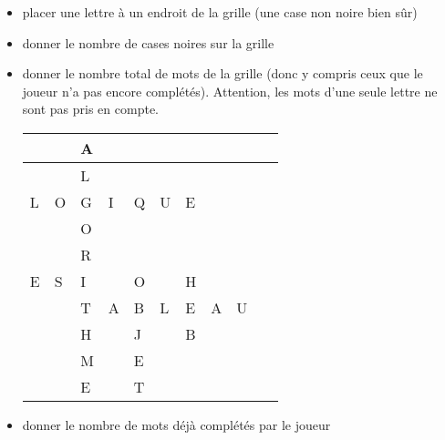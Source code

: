 \liststyleListi
\begin{itemize}
\item {
placer une lettre à un endroit de la grille (une case non noire bien
sûr)}
\item {
donner le nombre de cases noires sur la grille}
\item {
donner le nombre total de mots de la grille (donc y compris ceux que le
joueur n’a pas encore complétés). Attention, les mots
d'une seule lettre ne sont pas pris en compte.}
\begin{center}
\begin{minipage}{5.749cm}
\begin{center}
\tablehead{}
\begin{supertabular}{|m{0.37cm}|m{0.37cm}|m{0.37cm}|m{0.37cm}|m{0.37cm}|m{0.37cm}|m{0.37cm}|m{0.37cm}|m{0.37cm}|m{0.41900003cm}|}
\hline
~
 &
~
 &
\centering  A &
~
 &
~
 &
~
 &
~
 &
~
 &
~
 &
~
\\\hline
~
 &
~
 &
\centering  L &
~
 &
~
 &
~
 &
~
 &
~
 &
~
 &
~
\\\hline
\centering  L &
\centering  O &
\centering  G &
\centering  I &
\centering  Q &
\centering  U &
\centering  E &
~
 &
~
 &
~
\\\hline
~
 &
~
 &
\centering  O &
~
 &
~
 &
~
 &
~
 &
~
 &
~
 &
~
\\\hline
~
 &
~
 &
\centering  R &
~
 &
~
 &
~
 &
~
 &
~
 &
~
 &
~
\\\hline
\centering  E &
\centering  S &
\centering  I &
~
 &
\centering  O &
~
 &
\centering  H &
~
 &
~
 &
~
\\\hline
~
 &
~
 &
\centering  T &
\centering  A &
\centering  B &
\centering  L &
\centering  E &
\centering  A &
\centering  U &
~
\\\hline
~
 &
~
 &
\centering  H &
~
 &
\centering  J &
~
 &
\centering  B &
~
 &
~
 &
~
\\\hline
~
 &
~
 &
\centering  M &
~
 &
\centering  E &
~
 &
~
 &
~
 &
~
 &
~
\\\hline
~
 &
~
 &
\centering  E &
~
 &
\centering  T &
~
 &
~
 &
~
 &
~
 &
~
\\\hline
\end{supertabular}
\end{center}
\end{minipage}
\end{center}
\item {
donner le nombre de mots déjà complétés par le joueur}
\end{itemize}

\bigskip

